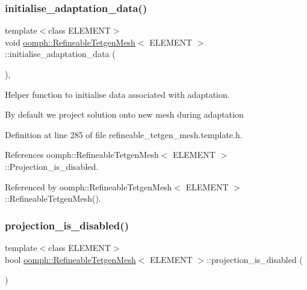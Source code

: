 \subsubsection{\texorpdfstring{initialise\+\_\+adaptation\+\_\+data()}{initialise\_adaptation\_data()}}
{\footnotesize\ttfamily template$<$class E\+L\+E\+M\+E\+NT$>$ \\
void \hyperlink{classoomph_1_1RefineableTetgenMesh}{oomph\+::\+Refineable\+Tetgen\+Mesh}$<$ E\+L\+E\+M\+E\+NT $>$\+::initialise\+\_\+adaptation\+\_\+data (\begin{DoxyParamCaption}{ }\end{DoxyParamCaption})\hspace{0.3cm}{\ttfamily [inline]}, {\ttfamily [protected]}}



Helper function to initialise data associated with adaptation. 

By default we project solution onto new mesh during adaptation 

Definition at line 285 of file refineable\+\_\+tetgen\+\_\+mesh.\+template.\+h.



References oomph\+::\+Refineable\+Tetgen\+Mesh$<$ E\+L\+E\+M\+E\+N\+T $>$\+::\+Projection\+\_\+is\+\_\+disabled.



Referenced by oomph\+::\+Refineable\+Tetgen\+Mesh$<$ E\+L\+E\+M\+E\+N\+T $>$\+::\+Refineable\+Tetgen\+Mesh().

\mbox{\label{classoomph_1_1RefineableTetgenMesh_a3c2bb21844f02403fa687fefc55ba5ad}} 
\subsubsection{\texorpdfstring{projection\+\_\+is\+\_\+disabled()}{projection\_is\_disabled()}}
{\footnotesize\ttfamily template$<$class E\+L\+E\+M\+E\+NT$>$ \\
bool \hyperlink{classoomph_1_1RefineableTetgenMesh}{oomph\+::\+Refineable\+Tetgen\+Mesh}$<$ E\+L\+E\+M\+E\+NT $>$\+::projection\+\_\+is\+\_\+disabled (\begin{DoxyParamCaption}{ }\end{DoxyParamCaption})\hspace{0.3cm}{\ttfamily [inline]}}



